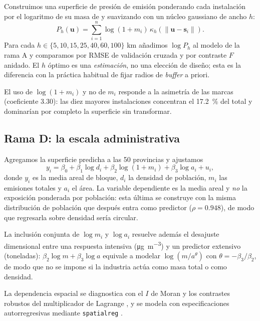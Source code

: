 \documentclass[10pt,twocolumn,a4paper]{article}
\newcommand{\ugm}{\si{\micro\gram\per\cubic\metre}}
\begin{document}
Construimos una superficie de presión de emisión ponderando cada instalación
por el logaritmo de su masa de  y suavizando con un núcleo gaussiano
de ancho $h$:
\begin{equation}
P_h(\mathbf{u}) = \sum_{i=1}^{n} \log(1 + m_i)\,
                  \kappa_h(\|\mathbf{u} - \mathbf{s}_i\|).
\label{eq:presion}
\end{equation}
Para cada $h \in \{5, 10, 15, 25, 40, 60, 100\}$ \si{\kilo\metre} añadimos
$\log P_h$ al modelo de la rama A y comparamos por RMSE de validación cruzada
y por contraste $F$ anidado. El $h$ óptimo es una \emph{estimación}, no una
elección de diseño; esta es la diferencia con la práctica habitual de fijar
radios de \emph{buffer} a priori.

El uso de $\log(1+m_i)$ y no de $m_i$ responde a la asimetría de las marcas
(coeficiente \num{3.30}): las diez mayores instalaciones concentran el
\SI{17.2}{\percent} del  total y dominarían por completo la superficie
sin transformar.

\subsection{Rama D: la escala administrativa}

Agregamos la superficie predicha a las \num{50} provincias y ajustamos
\begin{equation}
y_i = \beta_0 + \beta_1 \log d_i + \beta_2 \log(1+m_i) + \beta_3 \log a_i + u_i,
\label{eq:areal}
\end{equation}
donde $y_i$ es la media areal de bloque, $d_i$ la densidad de población, $m_i$
las emisiones totales y $a_i$ el área. La variable dependiente es la media
areal y \emph{no} la exposición ponderada por población: esta última se
construye con la misma distribución de población que después entra como
predictor ($\rho = \num{0.948}$), de modo que regresarla sobre densidad sería
circular.

La inclusión conjunta de $\log m_i$ y $\log a_i$ resuelve además el desajuste
dimensional entre una respuesta intensiva (\ugm) y un predictor extensivo
(toneladas): $\beta_2 \log m + \beta_3 \log a$ equivale a modelar
$\log(m/a^{\theta})$ con $\theta = -\beta_3/\beta_2$, de modo que no se impone
si la industria actúa como masa total o como densidad.

La dependencia espacial se diagnostica con el $I$ de Moran \citep{moran1950} y
los contrastes robustos del multiplicador de Lagrange \citep{anselin1996},
y se modela con especificaciones autorregresivas \citep{anselin1988} mediante
\texttt{spatialreg} \citep{bivand2015}.
\end{document}
